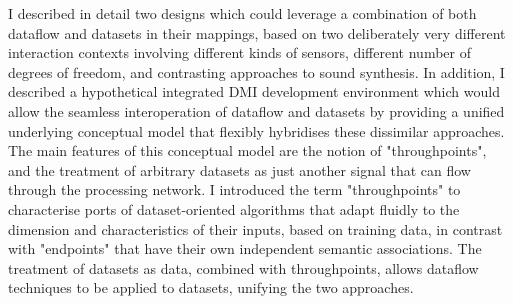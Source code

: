 \documentclass[main.tex]{subfiles}
\begin{document}
I described in detail two designs which could leverage a combination of both
dataflow and datasets in their mappings, based on two deliberately very
different interaction contexts involving different kinds of sensors, different
number of degrees of freedom, and contrasting approaches to sound synthesis. In
addition, I described a hypothetical integrated DMI development environment
which would allow the seamless interoperation of dataflow and datasets by
providing a unified underlying conceptual model that flexibly hybridises these
dissimilar approaches. The main features of this conceptual model are the
notion of "throughpoints", and the treatment of arbitrary datasets as just
another signal that can flow through the processing network. I introduced the
term "throughpoints" to characterise ports of dataset-oriented algorithms that
adapt fluidly to the dimension and characteristics of their inputs, based on
training data, in contrast with "endpoints" that have their own independent
semantic associations. The treatment of datasets as data, combined with
throughpoints, allows dataflow techniques to be applied to datasets, unifying
the two approaches.
\end{document}
